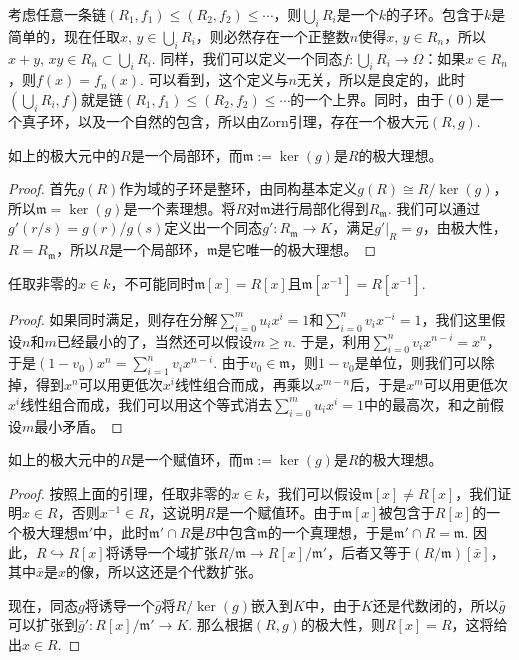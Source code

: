 考虑任意一条链$(R_1,f_1)\leq (R_2,f_2)\leq \cdots$，则$\bigcup_i R_i$是一个$k$的子环。包含于$k$是简单的，现在任取$x$, $y\in \bigcup_i R_i$，则必然存在一个正整数$n$使得$x$, $y\in R_n$，所以$x+y$, $xy\in R_n\subset \bigcup_i R_i$. 同样，我们可以定义一个同态$f:\bigcup_i R_i\to \Omega$：如果$x\in R_n$，则$f(x)=f_n(x)$. 可以看到，这个定义与$n$无关，所以是良定的，此时$(\bigcup_i R_i,f)$就是链$(R_1,f_1)\leq (R_2,f_2)\leq \cdots$的一个上界。同时，由于$(0)$是一个真子环，以及一个自然的包含，所以由Zorn引理，存在一个极大元$(R,g)$.

\begin{lem}
	如上的极大元中的$R$是一个局部环，而$\mathfrak m:=\ker(g)$是$R$的极大理想。
\end{lem}
	
\begin{proof}
	首先$g(R)$作为域的子环是整环，由同构基本定义$g(R)\cong R/\ker(g)$，所以$\mathfrak{m}=\ker (g)$是一个素理想。将$R$对$\mathfrak{m}$进行局部化得到$R_\mathfrak{m}$. 我们可以通过$g'(r/s)=g(r)/g(s)$定义出一个同态$g':R_\mathfrak{m}\to K$，满足$g'|_R=g$，由极大性，$R=R_\mathfrak{m}$，所以$R$是一个局部环，$\mathfrak{m}$是它唯一的极大理想。
\end{proof}

\begin{lem}
	任取非零的$x\in k$，不可能同时$\mathfrak m[x]=R[x]$且$\mathfrak m[x^{-1}]=R[x^{-1}]$.
\end{lem}

\begin{proof}
如果同时满足，则存在分解$\sum_{i=0}^mu_ix^i=1$和$\sum_{i=0}^nv_ix^{-i}=1$，我们这里假设$n$和$m$已经最小的了，当然还可以假设$m\geq n$. 于是，利用$\sum_{i=0}^nv_ix^{n-i}=x^n$，于是$(1-v_0)x^n=\sum_{i=1}^n v_i x^{n-i}$. 由于$v_0\in \mathfrak m$，则$1-v_0$是单位，则我们可以除掉，得到$x^n$可以用更低次$x^i$线性组合而成，再乘以$x^{m-n}$后，于是$x^m$可以用更低次$x^i$线性组合而成，我们可以用这个等式消去$\sum_{i=0}^mu_ix^i=1$中的最高次，和之前假设$m$最小矛盾。
\end{proof}

\begin{pro}
	如上的极大元中的$R$是一个赋值环，而$\mathfrak m:=\ker(g)$是$R$的极大理想。
\end{pro}

\begin{proof}
按照上面的引理，任取非零的$x\in k$，我们可以假设$\mathfrak m[x]\neq R[x]$，我们证明$x\in R$，否则$x^{-1}\in R$，这说明$R$是一个赋值环。由于$\mathfrak m[x]$被包含于$R[x]$的一个极大理想$\mathfrak m'$中，此时$\mathfrak m'\cap R$是$B$中包含$\mathfrak m$的一个真理想，于是$\mathfrak m'\cap R=\mathfrak m$. 因此，$R\hookrightarrow R[x]$将诱导一个域扩张$R/\mathfrak{m}\to R[x]/\mathfrak{m}'$，后者又等于$(R/\mathfrak{m})[\bar x]$，其中$\bar x$是$x$的像，所以这还是个代数扩张。

现在，同态$g$将诱导一个$\bar g$将$R/\ker(g)$嵌入到$K$中，由于$K$还是代数闭的，所以$\bar g$可以扩张到$\bar g':R[x]/\mathfrak{m}'\to K$. 那么根据$(R,g)$的极大性，则$R[x]=R$，这将给出$x\in R$.
\end{proof}

